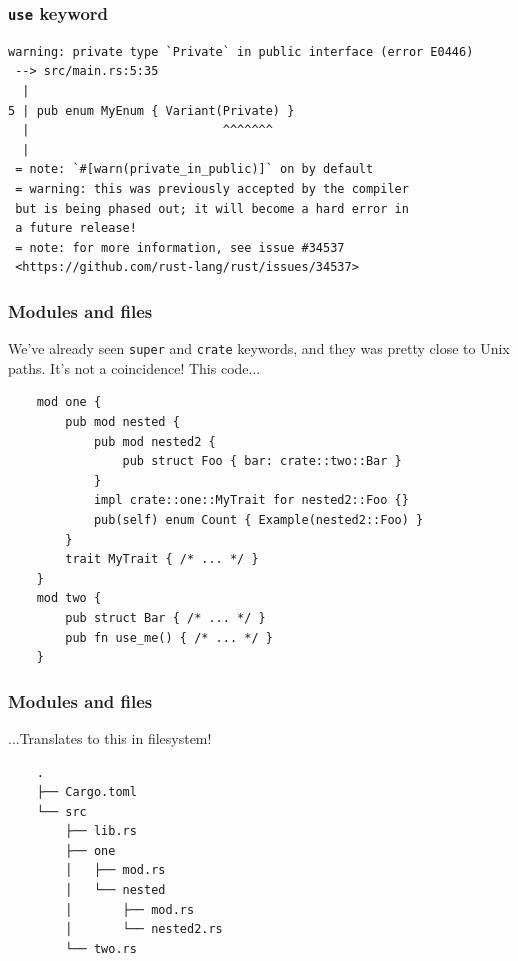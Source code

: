 \documentclass[aspectratio=1610,t]{beamer}
\begin{document}

\begin{frame}[fragile]
\frametitle{\texttt{use} keyword}
\begin{verbatim}
warning: private type `Private` in public interface (error E0446)
 --> src/main.rs:5:35
  |
5 | pub enum MyEnum { Variant(Private) }
  |                           ^^^^^^^
  |
 = note: `#[warn(private_in_public)]` on by default
 = warning: this was previously accepted by the compiler
 but is being phased out; it will become a hard error in
 a future release!
 = note: for more information, see issue #34537
 <https://github.com/rust-lang/rust/issues/34537>
\end{verbatim}
\end{frame}


\begin{frame}[fragile,c]
\frametitle{Modules and files}
We've already seen \texttt{super} and \texttt{crate} keywords, and they was pretty close to Unix paths. It's not a coincidence! This code...

\begin{verbatim}
    mod one {
        pub mod nested {
            pub mod nested2 {
                pub struct Foo { bar: crate::two::Bar }
            }
            impl crate::one::MyTrait for nested2::Foo {}
            pub(self) enum Count { Example(nested2::Foo) }
        }
        trait MyTrait { /* ... */ }
    }
    mod two {
        pub struct Bar { /* ... */ }
        pub fn use_me() { /* ... */ }
    }
\end{verbatim}
\end{frame}


\begin{frame}[fragile]
\frametitle{Modules and files}
...Translates to this in filesystem!

\small\begin{verbatim}
    .
    ├── Cargo.toml
    └── src
        ├── lib.rs
        ├── one
        │   ├── mod.rs
        │   └── nested
        │       ├── mod.rs
        │       └── nested2.rs
        └── two.rs
\end{verbatim}
\end{frame}

\end{document}
